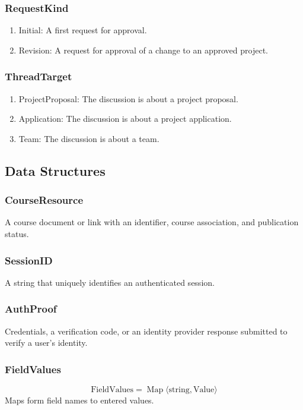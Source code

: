 \documentclass[12pt, titlepage]{article}
\begin{document}
\subsubsection{RequestKind}
\begin{enumerate}
    \item Initial: A first request for approval.
    \item Revision: A request for approval of a change to an approved project.
\end{enumerate}

\subsubsection{ThreadTarget}
\begin{enumerate}
    \item ProjectProposal: The discussion is about a project proposal.
    \item Application: The discussion is about a project application.
    \item Team: The discussion is about a team.
\end{enumerate}

\subsection{Data Structures}

\subsubsection{CourseResource}
A course document or link with an identifier, course association, and publication status.

\subsubsection{SessionID}
A string that uniquely identifies an authenticated session.

\subsubsection{AuthProof}
Credentials, a verification code, or an identity provider response submitted to verify a user's identity.

\subsubsection{FieldValues}
\[
\text{FieldValues} = \operatorname{Map}\langle\text{string},\text{Value}\rangle
\]
Maps form field names to entered values.
\end{document}
